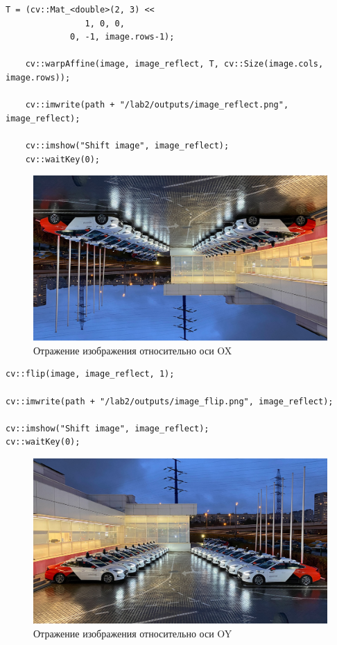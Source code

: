 \begin{lstlisting}[style=cpp_white, caption={Исходный код для отражения изображения относительно оси OX}]
    T = (cv::Mat_<double>(2, 3) << 
                1, 0, 0, 
             0, -1, image.rows-1); 

    cv::warpAffine(image, image_reflect, T, cv::Size(image.cols, image.rows));

    cv::imwrite(path + "/lab2/outputs/image_reflect.png", image_reflect);

    cv::imshow("Shift image", image_reflect); 
    cv::waitKey(0); 
\end{lstlisting}

\begin{figure}[ht]
    \includegraphics[width=\textwidth]{../outputs/image_reflect.png}
    \caption{Отражение изображения относительно оси OX}
    \label{fig:mirror_image_x}
\end{figure}

\begin{lstlisting}[style=cpp_white, caption={Исходный код для отражения изображения относительно оси OY}]
cv::flip(image, image_reflect, 1);

cv::imwrite(path + "/lab2/outputs/image_flip.png", image_reflect);

cv::imshow("Shift image", image_reflect); 
cv::waitKey(0); 
\end{lstlisting}

\begin{figure}[ht]
    \includegraphics[width=\textwidth]{../outputs/image_flip.png}
    \caption{Отражение изображения относительно оси OY}
    \label{fig:mirror_image_Y}
\end{figure}

